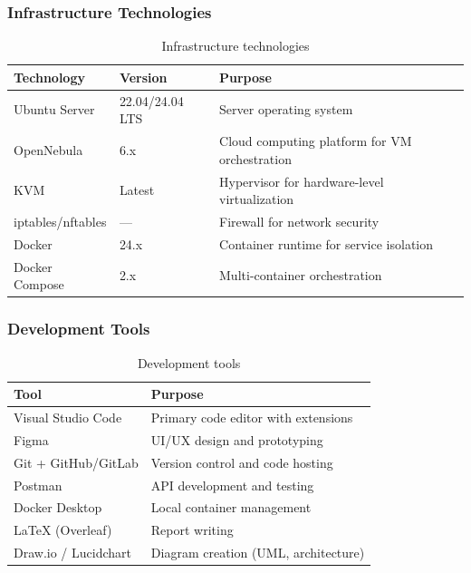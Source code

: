 \subsubsection{Infrastructure Technologies}

\begin{table}[H]
\centering
\caption{Infrastructure technologies}
\label{tab:infra-tech}
\begin{tabularx}{\textwidth}{|l|l|X|}
\hline
\rowcolor{blue!15}
\textbf{Technology} & \textbf{Version} & \textbf{Purpose} \\
\hline
Ubuntu Server & 22.04/24.04 LTS & Server operating system \\
\hline
OpenNebula & 6.x & Cloud computing platform for VM orchestration \\
\hline
KVM & Latest & Hypervisor for hardware-level virtualization \\
\hline
iptables/nftables & — & Firewall for network security \\
\hline
Docker & 24.x & Container runtime for service isolation \\
\hline
Docker Compose & 2.x & Multi-container orchestration \\
\hline
\end{tabularx}
\end{table}

\subsubsection{Development Tools}

\begin{table}[H]
\centering
\caption{Development tools}
\label{tab:dev-tools}
\begin{tabularx}{\textwidth}{|l|X|}
\hline
\rowcolor{blue!15}
\textbf{Tool} & \textbf{Purpose} \\
\hline
Visual Studio Code & Primary code editor with extensions \\
\hline
Figma & UI/UX design and prototyping \\
\hline
Git + GitHub/GitLab & Version control and code hosting \\
\hline
Postman & API development and testing \\
\hline
Docker Desktop & Local container management \\
\hline
\LaTeX{} (Overleaf) & Report writing \\
\hline
Draw.io / Lucidchart & Diagram creation (UML, architecture) \\
\hline
\end{tabularx}
\end{table}

